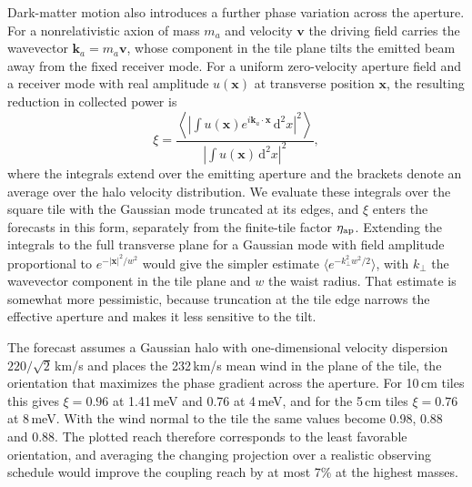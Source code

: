 \documentclass[
  aps,prl,reprint,superscriptaddress,
  amsmath,amssymb,floatfix,nofootinbib
]{revtex4-2}
\newcommand{\dd}{\mathrm d}
\begin{document}
Dark-matter motion also introduces a further phase variation across the aperture. For a nonrelativistic axion of mass $m_a$ and velocity $\mathbf v$ the driving field carries the wavevector $\mathbf k_a=m_a\mathbf v$, whose component in the tile plane tilts the emitted beam away from the fixed receiver mode. For a uniform zero-velocity aperture field and a receiver mode with real amplitude $u(\mathbf x)$ at transverse position $\mathbf x$, the resulting reduction in collected power is
\begin{equation}
\xi=\frac{\left\langle\left|\int u(\mathbf x)e^{i\mathbf k_a\cdot\mathbf x}\,\dd^2x\right|^2\right\rangle}
{|\int u(\mathbf x)\,\dd^2x|^2},
\label{eq:halo_overlap}
\end{equation}
where the integrals extend over the emitting aperture and the brackets denote an average over the halo velocity distribution. We evaluate these integrals over the square tile with the Gaussian mode truncated at its edges, and $\xi$ enters the forecasts in this form, separately from the finite-tile factor $\eta_{\rm ap}$. Extending the integrals to the full transverse plane for a Gaussian mode with field amplitude proportional to $e^{-|\mathbf x|^2/w^2}$ would give the simpler estimate $\langle e^{-k_\perp^2w^2/2}\rangle$, with $k_\perp$ the wavevector component in the tile plane and $w$ the waist radius. That estimate is somewhat more pessimistic, because truncation at the tile edge narrows the effective aperture and makes it less sensitive to the tilt.

The forecast assumes a Gaussian halo with one-dimensional velocity dispersion $220/\sqrt2$\,km/s and places the 232\,km/s mean wind in the plane of the tile, the orientation that maximizes the phase gradient across the aperture. For 10\,cm tiles this gives $\xi=0.96$ at 1.41\,meV and 0.76 at 4\,meV, and for the 5\,cm tiles $\xi=0.76$ at 8\,meV. With the wind normal to the tile the same values become 0.98, 0.88 and 0.88. The plotted reach therefore corresponds to the least favorable orientation, and averaging the changing projection over a realistic observing schedule would improve the coupling reach by at most 7\% at the highest masses.
\end{document}
